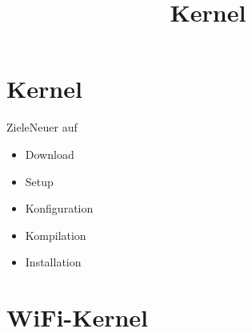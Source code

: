 \documentclass{beamer}
\title{Kernel}
\begin{document}
\part{Kernel}
\frame{\partpage}
\frame{\titlepage}



\begin{frame}{Ziele}{Neuer  auf \target}
 \begin{itemize}
  \item Download
  \item Setup
  \item Konfiguration
  \item Kompilation
  \item Installation
 \end{itemize}
\end{frame}






%






\part{WiFi-Kernel}
\frame{\partpage}

\end{document}
